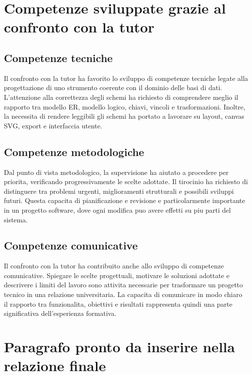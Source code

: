 \section{Competenze sviluppate grazie al confronto con la tutor}

\subsection{Competenze tecniche}

Il confronto con la tutor ha favorito lo sviluppo di competenze tecniche legate alla progettazione di uno strumento coerente con il dominio delle basi di dati. L'attenzione alla correttezza degli schemi ha richiesto di comprendere meglio il rapporto tra modello ER, modello logico, chiavi, vincoli e trasformazioni. Inoltre, la necessita di rendere leggibili gli schemi ha portato a lavorare su layout, canvas SVG, export e interfaccia utente.

\subsection{Competenze metodologiche}

Dal punto di vista metodologico, la supervisione ha aiutato a procedere per priorita, verificando progressivamente le scelte adottate. Il tirocinio ha richiesto di distinguere tra problemi urgenti, miglioramenti strutturali e possibili sviluppi futuri. Questa capacita di pianificazione e revisione e particolarmente importante in un progetto software, dove ogni modifica puo avere effetti su piu parti del sistema.

\subsection{Competenze comunicative}

Il confronto con la tutor ha contribuito anche allo sviluppo di competenze comunicative. Spiegare le scelte progettuali, motivare le soluzioni adottate e descrivere i limiti del lavoro sono attivita necessarie per trasformare un progetto tecnico in una relazione universitaria. La capacita di comunicare in modo chiaro il rapporto tra funzionalita, obiettivi e risultati rappresenta quindi una parte significativa dell'esperienza formativa.

\section{Paragrafo pronto da inserire nella relazione finale}

